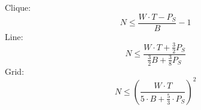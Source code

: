 \vspace{4mm}
\noindent
Clique:
\begin{equation}
	N \leq \frac{W \cdot T - P_S}{B} -1
\label{eq:scal_clique}
\end{equation}
Line:
\begin{equation}
	N \leq \frac{W \cdot T + \frac{3}{2}P_S}{\frac{3}{2}B+\frac{3}{8}P_S}
\label{eq:scal_line}
\end{equation}
Grid:
\begin{equation}
	N \leq (\frac{W \cdot T}{5 \cdot B + \frac{5}{3} \cdot P_S})^2
\label{eq:scal_grid}
\end{equation}


